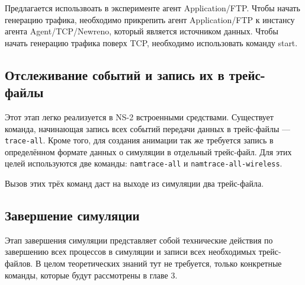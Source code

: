 Предлагается использвоать в эксперименте агент Application/FTP. Чтобы начать генерацию трафика, необходимо прикрепить агент Application/FTP к инстансу агента Agent/TCP/Newreno, который является источником данных. Чтобы начать генерацию трафика поверх TCP, необходимо использовать команду start.

\subsection{Отслеживание событий и запись их в трейс-файлы}

Этот этап легко реализуется в NS-2 встроенными средствами. Существует команда, начинающая запись всех событий передачи данных в трейс-файлы --- \verb|trace-all|.
Кроме того, для создания анимации так же требуется запись в определённом формате данных о симуляции в отдельный трейс-файл. Для этих целей используются две команды: \verb|namtrace-all| и \verb|namtrace-all-wireless|.

Вызов этих трёх команд даст на выходе из симуляции два трейс-файла.

\subsection{Завершение симуляции}

Этап завершения симуляции представляет собой технические действия по завершению всех процессов в симуляции и записи всех необходимых трейс-файлов. В целом теоретических знаний тут не требуется, только конкретные команды, которые будут рассмотрены в главе 3.
